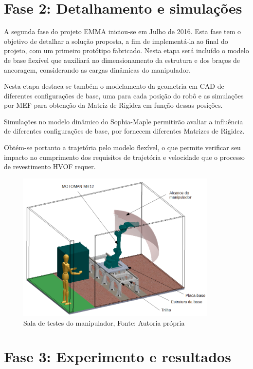 \section{Fase 2: Detalhamento e simulações}

A segunda fase do projeto EMMA iniciou-se em Julho de 2016. Esta fase tem o
objetivo de detalhar a solução proposta, a fim de implementá-la ao final
do projeto, com um primeiro protótipo fabricado. Nesta etapa será incluído o
modelo de base flexível que auxiliará no dimensionamento da estrutura e dos braços de
ancoragem, considerando as cargas dinâmicas do manipulador. 

Nesta etapa destaca-se também o modelamento da geometria em CAD de diferentes
configurações de base, uma para cada posição do robô e as simulações por MEF
para obtenção da Matriz de Rigidez em função dessas posições. 

Simulações no modelo dinâmico do Sophia-Maple permitirão avaliar a influência de
diferentes configurações de base, por fornecem diferentes Matrizes de Rigidez.

Obtém-se portanto a trajetória pelo modelo flexível, o que permite verificar seu impacto no cumprimento dos requisitos de trajetória e velocidade
que o processo de revestimento HVOF requer.

\begin{figure}
\centering
\includegraphics[width=10cm]{figs/sala_testes.PNG}
\caption{Sala de testes do manipulador, Fonte: Autoria própria}
\label{fig::base_teste}
\end{figure}

\section{Fase 3: Experimento e resultados}

